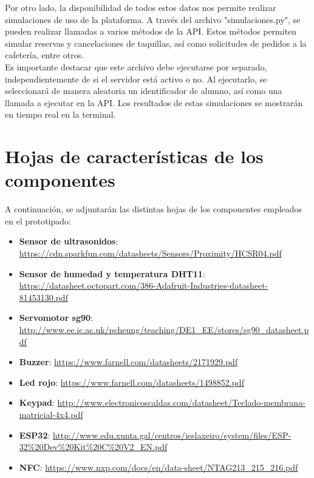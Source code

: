 \documentclass[12pt]{report}
\begin{document}
\begin{appendices}
Por otro lado, la disponibilidad de todos estos datos nos permite realizar simulaciones de uso de la plataforma. A través del archivo "simulaciones.py", se pueden realizar llamadas a varios métodos de la API. Estos métodos permiten simular reservas y cancelaciones de taquillas, así como solicitudes de pedidos a la cafetería, entre otros.\\

Es importante destacar que este archivo debe ejecutarse por separado, independientemente de si el servidor está activo o no. Al ejecutarlo, se seleccionará de manera aleatoria un identificador de alumno, así como una llamada a ejecutar en la API. Los resultados de estas simulaciones se mostrarán en tiempo real en la terminal.

\newpage
\chapter{Hojas de características de los componentes}
A continuación, se adjuntarán las distintas hojas de los componentes empleados en el prototipado:
\begin{itemize}
    \item \textbf{Sensor de ultrasonidos}: \url{https://cdn.sparkfun.com/datasheets/Sensors/Proximity/HCSR04.pdf}
    
    \item \textbf{Sensor de humedad y temperatura DHT11}: \url{https://datasheet.octopart.com/386-Adafruit-Industries-datasheet-81453130.pdf}
    
    \item \textbf{Servomotor sg90}: \url{http://www.ee.ic.ac.uk/pcheung/teaching/DE1_EE/stores/sg90_datasheet.pdf}
    
    \item \textbf{Buzzer}: \url{https://www.farnell.com/datasheets/2171929.pdf}
    
    \item \textbf{Led rojo}: \url{https://www.farnell.com/datasheets/1498852.pdf}
    
    \item \textbf{Keypad}: \url{http://www.electronicoscaldas.com/datasheet/Teclado-membrana-matricial-4x4.pdf}
    
    \item \textbf{ESP32}: \url{http://www.edu.xunta.gal/centros/ieslaxeiro/system/files/ESP-32%20Dev%20Kit%20C%20V2_EN.pdf}
    
    \item \textbf{NFC}: \url{https://www.nxp.com/docs/en/data-sheet/NTAG213_215_216.pdf}
\end{itemize}

\newpage
\end{appendices}
\end{document}
